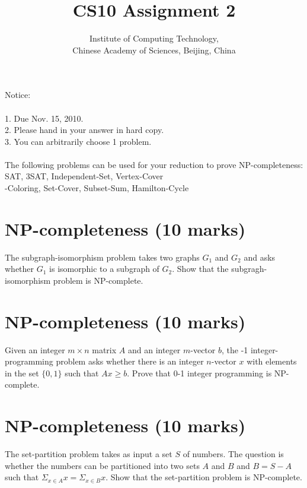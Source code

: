 \documentclass[a4paper,11pt]{article}
\title{CS10 Assignment 2}
\author{Institute of Computing Technology, \\
                       Chinese Academy of Sciences, Beijing, China }
\begin{document}
\maketitle

Notice:\\\\
1. Due Nov. 15, 2010.\\
2. Please hand in your answer in hard copy.\\
3. You can arbitrarily choose 1 problem.\\\\
The following problems can be used for your reduction to prove NP-completeness: \\
{\sc SAT}, {\sc 3SAT}, {\sc Independent-Set}, {\sc Vertex-Cover}\\
{-Coloring}, {\sc Set-Cover}, {\sc Subset-Sum}, {\sc Hamilton-Cycle}\\
% 

\section{NP-completeness (10 marks)}

The {\sc subgraph-isomorphism} problem takes two graphs $G_1$ and $G_2$ and asks whether $G_1$ is isomorphic to a subgraph of $G_2$. Show that the subgragh-isomorphism problem is NP-complete.

\section{NP-completeness (10 marks)}

Given an integer $m\times n$ matrix $A$ and an integer $m$-vector $b$, the {-1 integer-programming} problem asks whether there is an integer $n$-vector $x$ with elements in the set $\{0,1 \}$ such that $Ax\geq b$. Prove that 0-1 integer programming is NP-complete.

\section{NP-completeness (10 marks)}

The {\sc set-partition} problem takes as input a set $S$ of numbers. The question is whether the numbers can be partitioned into two sets $A$ and $B$ and $B = S-A$ such that $\Sigma_{x\in A} x=\Sigma_{x\in B} x$. Show that the set-partition problem is NP-complete.
\end{document}
